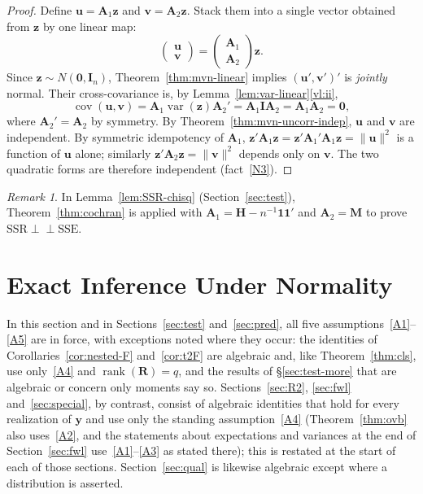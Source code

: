 \documentclass[14pt]{extarticle}
\theoremstyle{plain}
\theoremstyle{definition}
\theoremstyle{remark}
\newtheorem{remark}[theorem]{Remark}
\DeclareMathOperator\var{var}
\DeclareMathOperator\cov{cov}
\DeclareMathOperator\rank{rank}
\newcommand{\SSR}{\mathrm{SSR}}
\newcommand{\SSE}{\mathrm{SSE}}
\newcommand{\by}{\mathbf{y}}
\newcommand{\bI}{\mathbf{I}}
\newcommand{\bH}{\mathbf{H}}
\newcommand{\bM}{\mathbf{M}}
\newcommand{\bR}{\mathbf{R}}
\newcommand{\bone}{\mathbf{1}}
\newcommand{\bzero}{\mathbf{0}}
\newcommand{\bz}{\mathbf{z}}
\newcommand{\bA}{\mathbf{A}}
\newcommand{\bv}{\mathbf{v}}
\newcommand{\indep}{\perp\!\!\!\perp}
\newcommand{\bu}{\mathbf{u}}
\begin{document}
\begin{proof}
Define $\bu = \bA_1\bz$ and $\bv = \bA_2\bz$. Stack them into a single vector obtained from $\bz$ by one linear map:
\[
\begin{pmatrix}\bu\\\bv\end{pmatrix} = \begin{pmatrix}\bA_1 \\ \bA_2\end{pmatrix}\bz.
\]
Since $\bz \sim N(\bzero, \bI_n)$, Theorem~\ref{thm:mvn-linear} implies $(\bu', \bv')'$ is \emph{jointly} normal. Their cross-covariance is, by Lemma~\ref{lem:var-linear}\ref{vl:ii},
\[
\cov(\bu, \bv) = \bA_1\var(\bz)\bA_2' = \bA_1\bI\bA_2 = \bA_1\bA_2 = \bzero,
\]
where $\bA_2' = \bA_2$ by symmetry. By Theorem~\ref{thm:mvn-uncorr-indep}, $\bu$ and $\bv$ are independent. By symmetric idempotency of $\bA_1$, $\bz'\bA_1\bz = \bz'\bA_1'\bA_1\bz = \|\bu\|^2$ is a function of $\bu$ alone; similarly $\bz'\bA_2\bz = \|\bv\|^2$ depends only on $\bv$. The two quadratic forms are therefore independent (fact~\ref{N3}).
\end{proof}

\begin{remark}\label{rem:cochran-use}
In Lemma~\ref{lem:SSR-chisq} (Section~\ref{sec:test}), Theorem~\ref{thm:cochran} is applied with $\bA_1 = \bH - n^{-1}\bone\bone'$ and $\bA_2 = \bM$ to prove $\SSR \indep \SSE$.
\end{remark}

\section{Exact Inference Under Normality}\label{sec:exact}

In this section and in Sections~\ref{sec:test} and~\ref{sec:pred}, all five assumptions~\ref{A1}--\ref{A5} are in force, with exceptions noted where they occur: the identities of Corollaries~\ref{cor:nested-F} and~\ref{cor:t2F} are algebraic and, like Theorem~\ref{thm:cls}, use only~\ref{A4} and $\rank(\bR) = q$, and the results of \S\ref{sec:test-more} that are algebraic or concern only moments say so. Sections~\ref{sec:R2}, \ref{sec:fwl} and~\ref{sec:special}, by contrast, consist of algebraic identities that hold for every realization of $\by$ and use only the standing assumption~\ref{A4} (Theorem~\ref{thm:ovb} also uses~\ref{A2}, and the statements about expectations and variances at the end of Section~\ref{sec:fwl} use~\ref{A1}--\ref{A3} as stated there); this is restated at the start of each of those sections. Section~\ref{sec:qual} is likewise algebraic except where a distribution is asserted.
\end{document}
